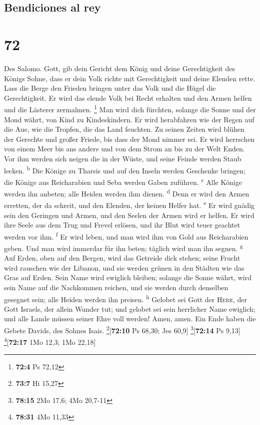\hypertarget{bendiciones-al-rey}{%
\subsection{Bendiciones al rey}\label{bendiciones-al-rey}}

\hypertarget{section-71}{%
\section{72}\label{section-71}}

 Des Salomo. Gott, gib dein Gericht dem König und deine
Gerechtigkeit des Königs Sohne,  dass er dein Volk richte
mit Gerechtigkeit und deine Elenden rette.  Lass die Berge
den Frieden bringen unter das Volk und die Hügel die Gerechtigkeit.
 Er wird das elende Volk bei Recht erhalten und den Armen
helfen und die Lästerer zermalmen. \footnote{\textbf{72:4} Ps 72,12}
 Man wird dich fürchten, solange die Sonne und der Mond
währt, von Kind zu Kindeskindern.  Er wird herabfahren wie
der Regen auf die Aue, wie die Tropfen, die das Land feuchten.
 Zu seinen Zeiten wird blühen der Gerechte und großer
Friede, bis dass der Mond nimmer sei.  Er wird herrschen
von einem Meer bis ans andere und von dem Strom an bis zu der Welt
Enden.  Vor ihm werden sich neigen die in der Wüste, und
seine Feinde werden Staub lecken. \textsuperscript{b} 
Die Könige zu Tharsis und auf den Inseln werden Geschenke bringen; die
Könige aus Reicharabien und Seba werden Gaben zuführen.
\textsuperscript{c}  Alle Könige werden ihn anbeten; alle
Heiden werden ihm dienen. \textsuperscript{d}  Denn er
wird den Armen erretten, der da schreit, und den Elenden, der keinen
Helfer hat. \textsuperscript{e}  Er wird gnädig sein den
Geringen und Armen, und den Seelen der Armen wird er helfen.
 Er wird ihre Seele aus dem Trug und Frevel erlösen, und
ihr Blut wird teuer geachtet werden vor ihm. \textsuperscript{f}
 Er wird leben, und man wird ihm von Gold aus
Reicharabien geben. Und man wird immerdar für ihn beten; täglich wird
man ihn segnen. \textsuperscript{g}  Auf Erden, oben auf
den Bergen, wird das Getreide dick stehen; seine Frucht wird rauschen
wie der Libanon, und sie werden grünen in den Städten wie das Gras auf
Erden.  Sein Name wird ewiglich bleiben; solange die
Sonne währt, wird sein Name auf die Nachkommen reichen, und sie werden
durch denselben gesegnet sein; alle Heiden werden ihn preisen.
\textsuperscript{h}  Gelobet sei Gott der \textsc{Herr},
der Gott Israels, der allein Wunder tut;  und gelobet sei
sein herrlicher Name ewiglich; und alle Lande müssen seiner Ehre voll
werden! Amen, amen.  Ein Ende haben die Gebete Davids,
des Sohnes Isais. \footnote{\textbf{73:7} Hi 15,27}{[}\textbf{72:10} Ps
68,30; Jes 60,9{]} \footnote{\textbf{78:15} 2Mo 17,6; 4Mo 20,7-11}{[}\textbf{72:14}
Ps 9,13{]} \footnote{\textbf{78:31} 4Mo 11,33}{[}\textbf{72:17} 1Mo
12,3; 1Mo 22,18{]}

